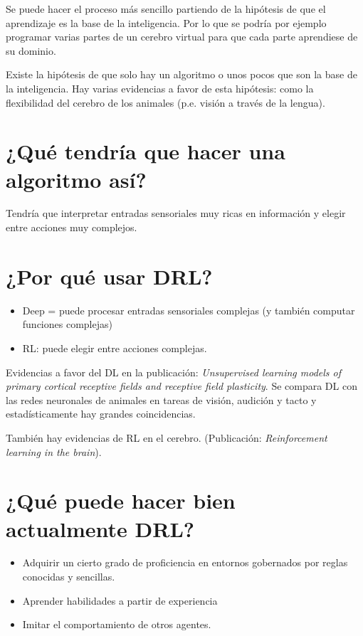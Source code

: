 Se puede hacer el proceso más sencillo partiendo de la hipótesis de que el aprendizaje es la base
de la inteligencia. Por lo que se podría por ejemplo programar varias partes de un cerebro
virtual para que cada parte aprendiese de su dominio.

Existe la hipótesis de que solo hay un algoritmo o unos pocos que son la base de la
inteligencia. Hay varias evidencias a favor de esta hipótesis: como la flexibilidad del cerebro
de los animales (p.e. visión a través de la lengua).

\section{¿Qué tendría que hacer una algoritmo así?}%
\label{sec:_qué_tendría_que_hacer_una_algoritmo_así_}

Tendría que interpretar entradas sensoriales muy ricas en información y elegir entre
acciones muy complejos.

\section{¿Por qué usar DRL?}%
\label{sec:_por_qué_usar_drl_}

\begin{itemize}
    \item Deep = puede procesar entradas sensoriales complejas (y también computar funciones
        complejas)
    \item RL: puede elegir entre acciones complejas.
\end{itemize}

Evidencias a favor del DL en la publicación: \textit{Unsupervised learning models of primary
cortical receptive fields and receptive field plasticity}. Se compara DL con las redes
neuronales de animales en tareas de visión, audición y tacto y estadísticamente hay grandes
coincidencias.

También hay evidencias de RL en el cerebro. (Publicación: \textit{Reinforcement
learning in the brain}). 

\section{¿Qué puede hacer bien actualmente DRL?}%
\label{sec:_qué_puede_hacer_bien_actualmente_drl_}

\begin{itemize}
    \item Adquirir un cierto grado de proficiencia en entornos gobernados por reglas
        conocidas y sencillas.
    \item Aprender habilidades a partir de experiencia
    \item Imitar el comportamiento de otros agentes.
\end{itemize}

